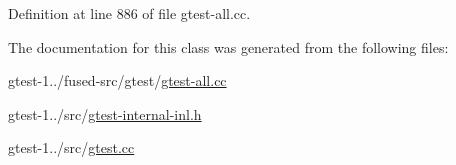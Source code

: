 \-Definition at line 886 of file gtest-\/all.\-cc.



\-The documentation for this class was generated from the following files\-:\begin{DoxyCompactItemize}
\item 
gtest-\/1../fused-\/src/gtest/\hyperlink{fused-src_2gtest_2gtest-all_8cc}{gtest-\/all.\-cc}\item 
gtest-\/1../src/\hyperlink{gtest-internal-inl_8h}{gtest-\/internal-\/inl.\-h}\item 
gtest-\/1../src/\hyperlink{gtest_8cc}{gtest.\-cc}\end{DoxyCompactItemize}
